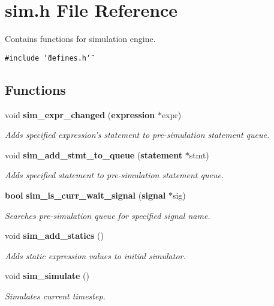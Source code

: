 \section{sim.h File Reference}
\label{sim_8h}
Contains functions for simulation engine.  


{\tt \#include \char`\"{}defines.h\char`\"{}}\par
\subsection*{Functions}
\begin{CompactItemize}
\item 
void {\bf sim\_\-expr\_\-changed} ({\bf expression} $\ast$expr)
\begin{CompactList}\small\item\em Adds specified expression's statement to pre-simulation statement queue. \item\end{CompactList}\item 
void {\bf sim\_\-add\_\-stmt\_\-to\_\-queue} ({\bf statement} $\ast$stmt)
\begin{CompactList}\small\item\em Adds specified statement to pre-simulation statement queue. \item\end{CompactList}\item 
{\bf bool} {\bf sim\_\-is\_\-curr\_\-wait\_\-signal} ({\bf signal} $\ast$sig)
\begin{CompactList}\small\item\em Searches pre-simulation queue for specified signal name. \item\end{CompactList}\item 
void {\bf sim\_\-add\_\-statics} ()
\begin{CompactList}\small\item\em Adds static expression values to initial simulator. \item\end{CompactList}\item 
void {\bf sim\_\-simulate} ()
\begin{CompactList}\small\item\em Simulates current timestep. \item\end{CompactList}\end{CompactItemize}


